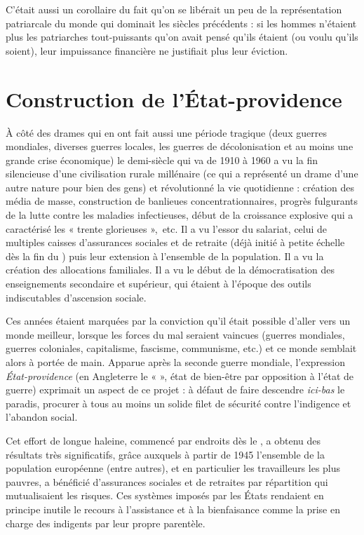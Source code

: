  C'était aussi un corollaire du fait qu'on se libérait un peu de la représentation patriarcale du monde qui dominait les siècles précédents : si les hommes n'étaient plus les patriarches tout-puissants qu'on avait pensé qu'ils étaient (ou voulu qu'ils soient), leur impuissance financière ne justifiait plus leur éviction.
 
 \section{Construction de l'État-providence}
 
 À côté des drames qui en ont fait aussi une période tragique (deux guerres mondiales, diverses guerres locales, les guerres de décolonisation et au moins une grande crise économique) le demi-siècle qui va de 1910 à 1960 a vu la fin silencieuse d'une civilisation rurale millénaire (ce qui a représenté un drame d'une autre nature pour bien des gens) et révolutionné la vie quotidienne : création des média de masse, construction de banlieues concentrationnaires, progrès fulgurants de la lutte contre les maladies infectieuses, début de la croissance explosive qui a caractérisé les « trente glorieuses »,~etc. Il a vu l'essor du salariat, celui de multiples caisses d'assurances sociales et de retraite (déjà initié à petite échelle dès la fin du ) puis leur extension à l'ensemble de la population. Il a vu la création des allocations familiales. Il a vu le début de la démocratisation des enseignements secondaire et supérieur, qui étaient à l'époque des outils indiscutables d'ascension sociale. 

 Ces années étaient marquées par la conviction qu'il était possible d'aller vers un monde meilleur, lorsque les forces du mal seraient vaincues (guerres mondiales, guerres coloniales, capitalisme, fascisme, communisme, etc.) et ce monde semblait alors à portée de main. Apparue après la seconde guerre mondiale, l'expression \emph{État-providence} (en Angleterre le «  », état de bien-être par opposition à l'état de guerre) exprimait un aspect de ce projet : à défaut de faire descendre {\emph{ici-bas}} le paradis, procurer à tous au moins un solide filet de sécurité contre l'indigence et l'abandon social. 

 Cet effort de longue haleine, commencé par endroits dès le , a obtenu des résultats très significatifs, grâce auxquels à partir de 1945 l'ensemble de la population européenne (entre autres), et en particulier les travailleurs les plus pauvres, a bénéficié d'assurances sociales et de retraites par répartition qui mutualisaient les risques. Ces systèmes imposés par les États rendaient en principe inutile le recours à l'assistance et à la bienfaisance comme la prise en charge des indigents par leur propre parentèle. 


